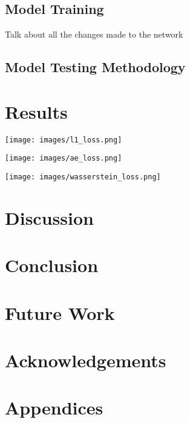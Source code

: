 \documentclass[twocolumn]{article}
\begin{document}
\subsection{Model Training}
\label{sec:orgb6bedc0}
Talk about all the changes made to the network
\subsection{Model Testing Methodology}
\label{sec:org7fef591}


\section{Results}
\label{sec:org43877b1}

\begin{center}
\texttt{[image: images/l1\_loss.png]}
\end{center}

\begin{center}
\texttt{[image: images/ae\_loss.png]}
\end{center}

\begin{center}
\texttt{[image: images/wasserstein\_loss.png]}
\end{center}


\section{Discussion}
\label{sec:org56a0191}

\section{Conclusion}
\label{sec:org698d5c7}

\section{Future Work}
\label{sec:org9a7675b}

\section*{Acknowledgements}

\printbibliography

\section*{Appendices}
\end{document}
